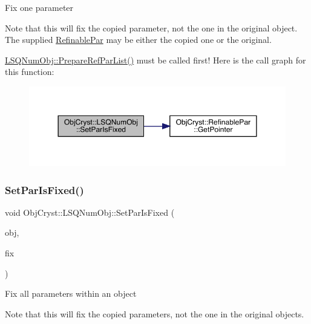 Fix one parameter

Note that this will fix the copied parameter, not the one in the original object. The supplied \mbox{\hyperlink{class_obj_cryst_1_1_refinable_par}{Refinable\+Par}} may be either the copied one or the original.

\mbox{\hyperlink{class_obj_cryst_1_1_l_s_q_num_obj_afdeb58450a3e0506fc02a0b5df15a600}{L\+S\+Q\+Num\+Obj\+::\+Prepare\+Ref\+Par\+List()}} must be called first! Here is the call graph for this function\+:
\nopagebreak
\begin{figure}[H]
\begin{center}
\leavevmode
\includegraphics[width=350pt]{class_obj_cryst_1_1_l_s_q_num_obj_ad240667179e473c6c16e8928893dfdf8_cgraph}
\end{center}
\end{figure}
\mbox{\label{class_obj_cryst_1_1_l_s_q_num_obj_a6fdf2b9d64a527b0c2e81f92fd9be2c3}} 
\subsubsection{\texorpdfstring{SetParIsFixed()}{SetParIsFixed()}\hspace{0.1cm}{\footnotesize\ttfamily [4/4]}}
{\footnotesize\ttfamily void Obj\+Cryst\+::\+L\+S\+Q\+Num\+Obj\+::\+Set\+Par\+Is\+Fixed (\begin{DoxyParamCaption}\item[{\mbox{\hyperlink{class_obj_cryst_1_1_refinable_obj}{Refinable\+Obj}} \&}]{obj,  }\item[{const bool}]{fix }\end{DoxyParamCaption})}

Fix all parameters within an object

Note that this will fix the copied parameters, not the one in the original objects.

